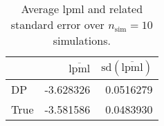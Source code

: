 \begin{table}[H]

\caption{Average lpml and related standard error over $n_{\text{sim}} = 10$ simulations.}
\centering
\begin{tabular}[t]{lrr}
\toprule
  & $\overbar{\text{lpml}}$ & $\text{sd}(\overbar{\text{lpml}})$\\
\midrule
DP & -3.628326 & 0.0516279\\
True & -3.581586 & 0.0483930\\
\bottomrule
\end{tabular}
\end{table}